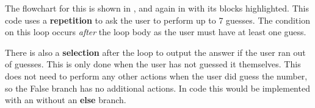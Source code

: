 The flowchart for this is shown in , and again in  with its blocks highlighted. This code uses a \textbf{repetition} to ask the user to perform up to 7 guesses. The condition on this loop occurs \emph{after} the loop body as the user must have at least one guess. 

There is also a \textbf{selection} after the loop to output the answer if the user ran out of guesses. This is only done when the user has not guessed it themselves. This does not need to perform any other actions when the user did guess the number, so the False branch has no additional actions. In code this would be implemented with an  without an \textbf{else} branch.


